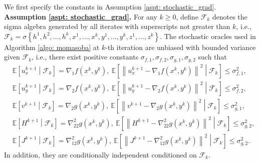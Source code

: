 \documentclass[10pt]{article}
\theoremstyle{remark}
\def\setF{\mathscr{F}} %
\newcommand{\E}{\mathbb{E}}
\newcommand{\norm}[1]{\left\|#1\right\|}
\begin{document}
We first specify the constants in Assumption \ref{aspt: stochastic_grad}.\\
\textbf{Assumption \ref{aspt: stochastic_grad}.}
    For any $k\geq 0$, define $\setF_k$ denotes the sigma algebra generated by all iterates with superscripts not greater than $k$, i.e., $\setF_k = \sigma\left\{h^1, h^2, ..., h^k, x^1,..., x^k, y^1, ..., y^k, z^1,...,z^k\right\}$.
    The stochastic oracles used in Algorithm \ref{algo: momasoba} at $k$-th iteration are unbiased with bounded variance given $\setF_k$, i.e., there exist positive constants $\sigma_{f,1}, \sigma_{f,2}, \sigma_{g,1}, \sigma_{g,2}$ such that
    \begin{align*}
    &\E\left[u_x^{k+1}\middle|\setF_k\right] = \nabla_1 f(x^k, y^k),\  \E\left[\norm{u_x^{k+1} - \nabla_1 f(x^k, y^k)}^2\middle|\setF_k\right]\leq \sigma_{f,1}^2,\\
    &\E\left[u_y^{k+1} \middle|\setF_k\right] = \nabla_2 f(x^k, y^k),\  \E\left[\norm{u_y^{k+1} - \nabla_2 f(x^k, y^k)}^2 \middle|\setF_k\right]\leq \sigma_{f,2}^2,\\
    &\E\left[v^{k+1}\middle|\setF_k\right] = \nabla_2 g(x^k, y^k),\ \E\left[\norm{v^{k+1} - \nabla_2 g(x^k, y^k)}^2\middle|\setF_k \right]\leq \sigma_{g,1}^2, \\
    &\E\left[H^{k+1}\middle|\setF_k\right] = \nabla_{22}^2 g(x^k,y^k),\ \E\left[\norm{H^{k+1} - \nabla_{22}^2g(x^k,y^k)}^2\middle|\setF_k\right]\leq \sigma_{g,2}^2,\\
    &\E\left[J^{k+1}\middle|\setF_k\right] = \nabla_{12}^2g(x^k, y^k),\  \E\left[\norm{J^{k+1} - \nabla_{12}^2g(x^k, y^k)}^2\middle|\setF_k\right] \leq \sigma_{g,2}^2.
\end{align*}
In addition, they are conditionally independent conditioned on $\setF_k$.\\
\end{document}

